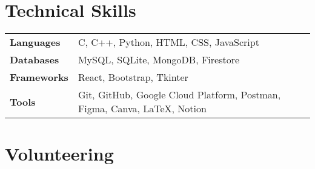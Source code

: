 \documentclass[a4paper,10pt]{article}
\begin{document}
\section{Technical Skills}
\begin{tabularx}{\linewidth}{@{}l X@{}}
\textbf{Languages} &  \normalsize{C, C++, Python, HTML, CSS, JavaScript}\\
\textbf{Databases} &  \normalsize{MySQL, SQLite, MongoDB, Firestore}\\
\textbf{Frameworks}  &  \normalsize{React, Bootstrap, Tkinter}\\
\textbf{Tools}  &  \normalsize{Git, GitHub, Google Cloud Platform, Postman, Figma, Canva, LaTeX, Notion}\\
\end{tabularx}

\section{Volunteering}
\end{document}
